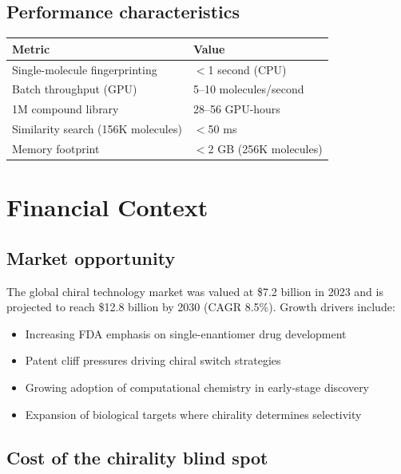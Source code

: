 \documentclass[11pt,a4paper]{article}
\begin{document}
\subsection{Performance characteristics}

\begin{center}
\begin{tabular}{ll}
\toprule
\textbf{Metric} & \textbf{Value} \\
\midrule
Single-molecule fingerprinting & $<$1 second (CPU) \\
Batch throughput (GPU) & 5--10 molecules/second \\
1M compound library & 28--56 GPU-hours \\
Similarity search (156K molecules) & $<$50 ms \\
Memory footprint & $<$2 GB (256K molecules) \\
\bottomrule
\end{tabular}
\end{center}

\newpage

\section{Financial Context}

\subsection{Market opportunity}

The global chiral technology market was valued at \$7.2 billion in 2023 and is
projected to reach \$12.8 billion by 2030 (CAGR 8.5\%). Growth drivers include:

\begin{itemize}[leftmargin=1.5em]
  \item Increasing FDA emphasis on single-enantiomer drug development
  \item Patent cliff pressures driving chiral switch strategies
  \item Growing adoption of computational chemistry in early-stage discovery
  \item Expansion of biological targets where chirality determines selectivity
\end{itemize}

\subsection{Cost of the chirality blind spot}
\end{document}
